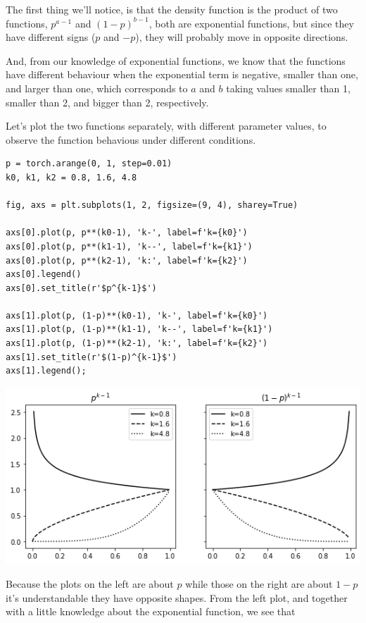 \documentclass[11pt]{article}
\begin{document}
The first thing we'll notice, is that the density function is the product of two functions, \(p^{a-1}\) and \((1-p)^{b-1}\), both are exponential functions, but since they have different signs (\(p\) and \(-p\)), they will probably move in opposite directions.

And, from our knowledge of exponential functions, we know that the functions have different behaviour when the exponential term is negative, smaller than one, and larger than one, which corresponds to \(a\) and \(b\) taking values smaller than 1, smaller than 2, and bigger than 2, respectively.

Let's plot the two functions separately, with different parameter values, to observe the function behavious under different conditions.

\begin{verbatim}
p = torch.arange(0, 1, step=0.01)
k0, k1, k2 = 0.8, 1.6, 4.8

fig, axs = plt.subplots(1, 2, figsize=(9, 4), sharey=True)

axs[0].plot(p, p**(k0-1), 'k-', label=f'k={k0}')
axs[0].plot(p, p**(k1-1), 'k--', label=f'k={k1}')
axs[0].plot(p, p**(k2-1), 'k:', label=f'k={k2}')
axs[0].legend()
axs[0].set_title(r'$p^{k-1}$')

axs[1].plot(p, (1-p)**(k0-1), 'k-', label=f'k={k0}')
axs[1].plot(p, (1-p)**(k1-1), 'k--', label=f'k={k1}')
axs[1].plot(p, (1-p)**(k2-1), 'k:', label=f'k={k2}')
axs[1].set_title(r'$(1-p)^{k-1}$')
axs[1].legend();
\end{verbatim}

\begin{center}
\includegraphics[width=.9\linewidth]{./.ob-jupyter/ab35f78f172dfab7dfd8bde3b1feccdc21ee89fc.png}
\end{center}

Because the plots on the left are about \(p\) while those on the right are about \(1-p\) it's understandable they have opposite shapes.
From the left plot, and together with a little knowledge about the exponential function, we see that
\end{document}
